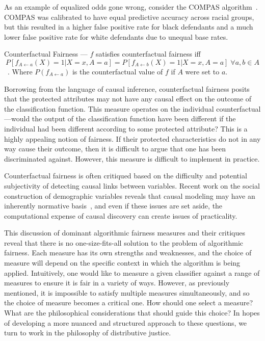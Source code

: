 As an example of equalized odds gone wrong, consider the COMPAS
algorithm~\citep{Angwin_2016}. COMPAS was calibrated to have equal predictive
accuracy across racial groups, but this resulted in a higher false positive rate
for black defendants and a much lower false positive rate for white defendants
due to unequal base rates.

\begin{definition}
    Counterfactual Fairness — $f$ satisfies counterfactual fairness iff
    \[P[f_{A \leftarrow a}(X) = 1 | X = x, A = a] = P[f_{A\leftarrow b}(X) = 1 |
         X = x, A = a]\;\forall a, b \in A\]~\citep{Kusner_2018}.
    Where $P(f_{A \leftarrow a})$ is the counterfactual value of $f$ if $A$ were
    set to $a$.
\end{definition}

Borrowing from the language of causal inference, counterfactual fairness posits
that the protected attributes may not have any causal effect on the outcome of
the classification function. This measure operates on the individual
counterfactual—would the output of the classification function have been 
different if the individual had been different according to some protected
attribute? This is a highly appealing notion of fairness.
If their protected characteristics do not in any way cause their outcome, then
it is difficult to argue that one has been discriminated against. However,
this measure is difficult to implement in practice.

Counterfactual fairness is often critiqued based on the difficulty and potential
subjectivity of detecting causal links between variables. Recent work on the 
social construction of demographic variables reveals that causal modeling may 
have an inherently normative basis~\citep{Hu_Forthcoming}, and even if these
issues are set aside, the computational expense of causal discovery can create
issues of practicality.

This discussion of dominant algorithmic fairness measures and their critiques
reveal that there is no one-size-fits-all solution to the problem of algorithmic
fairness. Each measure has its own strengths and weaknesses, and the choice of
measure will depend on the specific context in which the algorithm is being
applied. Intuitively, one would like to measure a given classifier against a
range of measures to ensure it is fair in a variety of ways. However, as
previously mentioned, it is impossible to satisfy multiple measures
simultaneously, and so the choice of measure becomes a critical one.
How should one select a measure? What are the philosophical
considerations that should guide this choice? In hopes of developing a more
nuanced and structured approach to these questions, we turn to work in the 
philosophy of distributive justice.

